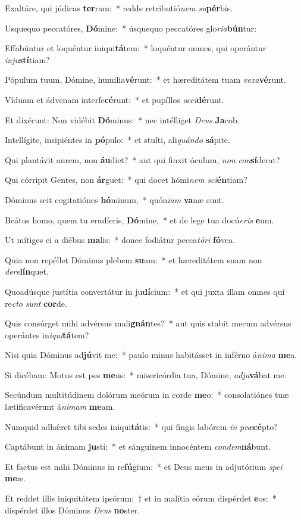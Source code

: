 \item Exaltáre, qui júdicas \textbf{ter}ram:~* redde retributió\textit{nem} \textit{su}\textbf{pér}bis.
\item Usquequo peccatóres, \textbf{Dó}mine:~* úsquequo peccatóres glo\textit{ria}\textbf{bún}tur:
\item Effabúntur et loquéntur iniqui\textbf{tá}tem:~* loquéntur omnes, qui operántur \textit{inju}\textbf{stí}tiam?
\item Pópulum tuum, Dómine, humilia\textbf{vé}runt:~* et hæreditátem tuam \textit{vexa}\textbf{vé}runt.
\item Víduam et ádvenam interfe\textbf{cé}runt:~* et pupíllos \textit{occi}\textbf{dé}runt.
\item Et dixérunt: Non vidébit \textbf{Dó}minus:~* nec intélliget \textit{Deus} \textbf{Ja}cob.
\item Intellígite, insipiéntes in \textbf{pó}pulo:~* et stulti, ali\textit{quándo} \textbf{sá}pite.
\item Qui plantávit aurem, non \textbf{áu}diet?~* aut qui finxit óculum, \textit{non} \textit{con}\textbf{sí}derat?
\item Qui córripit Gentes, non \textbf{ár}guet:~* qui docet hómi\textit{nem} \textit{sci}\textbf{én}tiam?
\item Dóminus scit cogitatiónes \textbf{hó}minum,~* quón\textit{iam} \textbf{va}næ sunt.
\item Beátus homo, quem tu erudíeris, \textbf{Dó}mine,~* et de lege tua docú\hspace{0.01em}\textit{eris} \textbf{e}um.
\item Ut mítiges ei a diébus \textbf{ma}lis:~* donec fodiátur pecca\textit{tóri} \textbf{fó}vea.
\item Quia non repéllet Dóminus plebem \textbf{su}am:~* et hæreditátem suam non \textit{dere}\textbf{lín}quet.
\item Quoadúsque justítia convertátur in ju\textbf{dí}cium:~* et qui juxta illam omnes qui re\textit{cto} \textit{sunt} \textbf{cor}de.
\item Quis consúrget mihi advérsus mali\textbf{gnán}tes?~* aut quis stabit mecum advérsus operántes in\textit{iqui}\textbf{tá}tem?
\item Nisi quia Dóminus ad\textbf{jú}vit me:~* paulo minus habitásset in inférno á\textit{nima} \textbf{me}a.
\item Si dicébam: Motus est pes \textbf{me}us:~* misericórdia tua, Dómine, \textit{adju}\textbf{vá}bat me.
\item Secúndum multitúdinem dolórum meórum in corde \textbf{me}o:~* consolatiónes tuæ lætificavérunt á\textit{nimam} \textbf{me}am.
\item Numquid adhǽret tibi sedes iniqui\textbf{tá}tis:~* qui fingis labórem \textit{in} \textit{præ}\textbf{cé}pto?
\item Captábunt in ánimam \textbf{ju}sti:~* et sánguinem innocéntem \textit{condem}\textbf{ná}bunt.
\item Et factus est mihi Dóminus in re\textbf{fú}gium:~* et Deus meus in adjutórium \textit{spei} \textbf{me}æ.
\item Et reddet illis iniquitátem i\-psórum:~† et in malítia eórum dispérdet \textbf{e}os:~* dispérdet illos Dóminus \textit{Deus} \textbf{no}ster.
